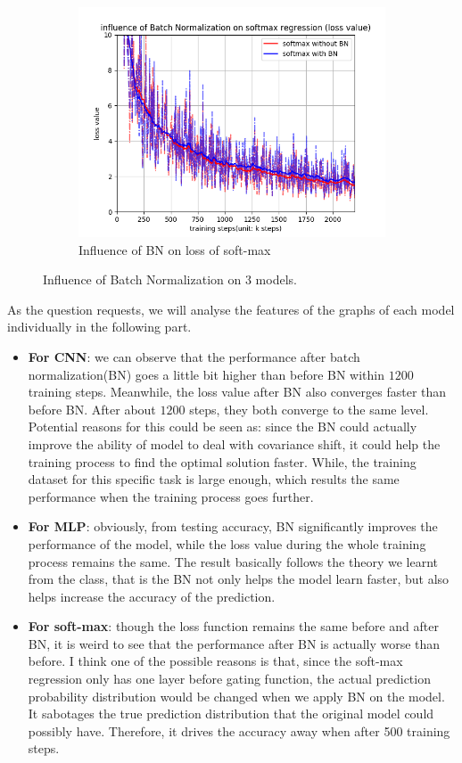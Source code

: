 \documentclass[12pt,letterpaper]{article}
\begin{document}
\begin{figure}[h]
\begin{subfigure}{0.32\textwidth}
    \includegraphics[width=\linewidth]{softmax_BN_loss.png}
    \caption{\small Influence of BN on loss of soft-max} \label{fig:d}
    \end{subfigure}
    \caption{Influence of Batch Normalization on $3$ models.} \label{fig:BN}
\end{figure}

As the question requests, we will analyse the features of the graphs of each model individually in the following part.
\begin{itemize}
    \item \textbf{For CNN}: we can observe that the performance after batch normalization(BN) goes a little bit higher than before BN within $1200$ training steps. Meanwhile, the loss value after BN also converges faster than before BN. After about $1200$ steps, they both converge to the same level. Potential reasons for this could be seen as: since the BN could actually improve the ability of model to deal with covariance shift, it could help the training process to find the optimal solution faster. While, the training dataset for this specific task is large enough, which results the same performance when the training process goes further.
    \item \textbf{For MLP}: obviously, from testing accuracy, BN significantly improves the performance of the model, while the loss value during the whole training process remains the same. The result basically follows the theory we learnt from the class, that is the BN not only helps the model learn faster, but also helps increase the accuracy of the prediction.
    \item \textbf{For soft-max}: though the loss function remains the same before and after BN, it is weird to see that the performance after BN is actually worse than before. I think one of the possible reasons is that, since the soft-max regression only has one layer before gating function, the actual prediction probability distribution would be changed when we apply BN on the model. It sabotages the true prediction distribution that the original model could possibly have. Therefore, it drives the accuracy away when after 500 training steps.
\end{itemize}
\end{document}
